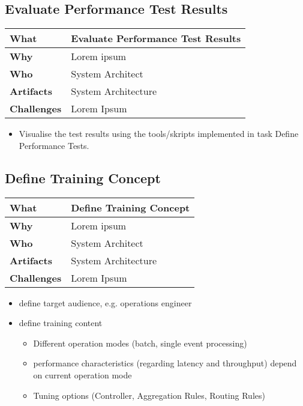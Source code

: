 \subsection{Evaluate Performance Test Results}
\begin{minipage}{\textwidth}
 \label{table:ch6_Evaluate_Performance_Results}
\begin{tabular}
	{|m{3cm}|m{10cm}|} \hline \bfseries What & Evaluate Performance Test Results\\
	\hline \bfseries Why & Lorem ipsum\\
	\hline \bfseries Who & System Architect\\
	\hline \bfseries Artifacts & System Architecture\\
	\hline \bfseries Challenges & Lorem Ipsum\\
	\hline 
\end{tabular}
\end{minipage}

\begin{itemize}
	\item Visualise the test results using the tools/skripts implemented in task Define Performance Tests.
\end{itemize}

\subsection{Define Training Concept}
\begin{minipage}{\textwidth}
 \label{table:ch6_Task_Define_Training_Concept}
\begin{tabular}
	{|m{3cm}|m{10cm}|} \hline \bfseries What & Define Training Concept\\
	\hline \bfseries Why & Lorem ipsum\\
	\hline \bfseries Who & System Architect\\
	\hline \bfseries Artifacts & System Architecture\\
	\hline \bfseries Challenges & Lorem Ipsum\\
	\hline 
\end{tabular}
\end{minipage}

\begin{itemize}
	\item define target audience, e.g. operations engineer
	\item define training content
	\begin{itemize}
		\item Different operation modes (batch, single event processing)
		\item performance characteristics (regarding latency and throughput) depend on current operation mode
		\item Tuning options (Controller, Aggregation Rules, Routing Rules)
	\end{itemize}
\end{itemize}

